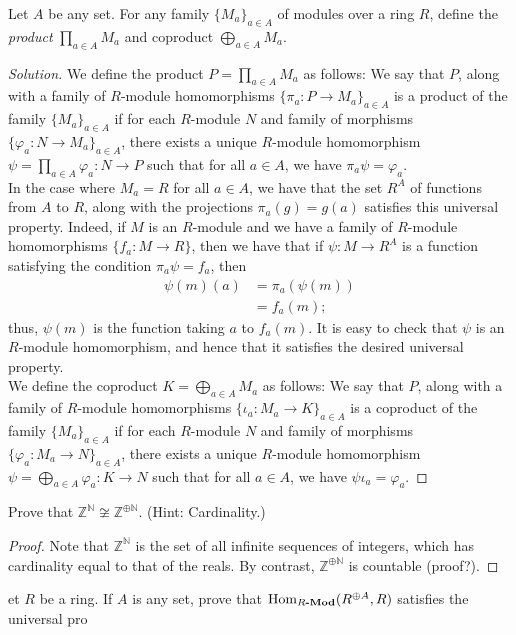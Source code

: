 \documentclass[12pt]{article}
\newenvironment{problem}[2][Problem]{\begin{trivlist}
\item[\hskip \labelsep {\bfseries #1}\hskip \labelsep {\bfseries #2.}]}{\end{trivlist}}
\newcommand{\catname}[1]{\normalfont\textbf{#1}}
\newcommand{\Hom}{\text{Hom}}
\newcommand{\Homod}[2]{\Hom_{#1\catname{-Mod}}(#2)}
\newcommand{\N}{\mathbb{N}}
\newcommand{\Z}{\mathbb{Z}}
\newenvironment{solution}
  {\renewcommand\qedsymbol{$\blacksquare$}\begin{proof}[Solution]}
{\end{proof}}
\theoremstyle{remark}
\begin{document}
\begin{problem}{6.7}
  Let $A$ be any set.
  For any family $\{M_a\}_{a\in A}$ of modules over a ring $R$,
  define the \textit{product} $\prod_{a\in A}M_a$ and coproduct
  $\bigoplus_{a\in A} M_a$.
\end{problem}
\begin{solution}
  We define the product $P=\prod_{a\in A} M_a$ as follows:
  We say that $P$, along with a family of $R$-module 
  homomorphisms $\{\pi_a:P\to M_a\}_{a\in A}$
  is a product of the family $\{M_a\}_{a\in A}$ if for each 
  $R$-module $N$ and family of morphisms $\{\varphi_a:N\to M_a\}_{a\in A}$,
  there exists a unique $R$-module homomorphism 
  $\psi=\prod_{a\in A}\varphi_a:N\to P$ such that
  for all $a\in A$, we have $\pi_a\psi=\varphi_a$. \\
  \indent In the case where $M_a=R$ for all $a\in A$, we have that
  the set $R^A$ of functions from $A$ to $R$, along with the projections
  $\pi_a(g)=g(a)$ satisfies this universal property.
  Indeed, if $M$ is an $R$-module and we have a family of $R$-module
  homomorphisms $\{f_a:M\to R\}$, then we have that if $\psi:M\to R^A$ 
  is a function satisfying the condition $\pi_a\psi=f_a$, then
  \begin{align*}
    \psi(m)(a) &= \pi_a(\psi(m)) \\
    &= f_a(m);
  \end{align*}
  thus, $\psi(m)$ is the function taking $a$ to $f_a(m)$.
  It is easy to check that $\psi$ is an $R$-module homomorphism, and hence
  that it satisfies the desired universal property.
  \\
  \indent We define the coproduct $K=\bigoplus_{a\in A} M_a$ as follows:
  We say that $P$, along with a family of $R$-module 
  homomorphisms $\{\iota_a:M_a\to K\}_{a\in A}$
  is a coproduct of the family $\{M_a\}_{a\in A}$ if for each 
  $R$-module $N$ and family of morphisms $\{\varphi_a:M_a\to N\}_{a\in A}$,
  there exists a unique $R$-module homomorphism 
  $\psi=\bigoplus_{a\in A}\varphi_a:K\to N$ such that
  for all $a\in A$, we have $\psi\iota_a=\varphi_a$.
\end{solution}
  Prove that $\Z^\N\not\cong\Z^{\oplus\N}$. (Hint: Cardinality.)
\begin{proof}
  Note that $\Z^\N$ is the set of all infinite sequences of integers, which
  has cardinality equal to that of the reals.
  By contrast, $\Z^{\oplus\N}$ is countable (proof?).
\end{proof}

\begin{problem}
  Let $R$ be a ring.
  If $A$ is any set, prove that $\Homod{R}{R^{\oplus A},R}$ satisfies
  the universal pro
\end{problem}
\end{document}
